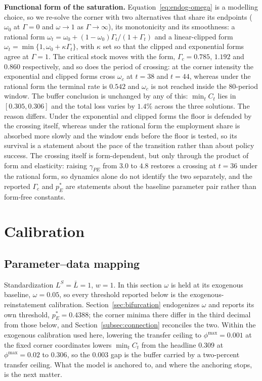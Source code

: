 \documentclass[review,12pt]{elsarticle}
\theoremstyle{plain}
\theoremstyle{definition}
\theoremstyle{remark}
\newcommand{\barL}{\bar{L}}
\begin{document}
\smallskip\noindent\textbf{Functional form of the saturation.}
Equation~\eqref{eq:endog-omega} is a modelling choice, so we re-solve the corner with two alternatives that share its endpoints ($\omega_0$ at $\Gamma=0$ and $\omega\to1$ as $\Gamma\to\infty$), its monotonicity and its smoothness: a rational form $\omega_t=\omega_0+(1-\omega_0)\Gamma_t/(1+\Gamma_t)$ and a linear-clipped form $\omega_t=\min\{1,\omega_0+\kappa\Gamma_t\}$, with $\kappa$ set so that the clipped and exponential forms agree at $\Gamma=1$. The critical stock moves with the form, $\Gamma_c=0.785$, $1.192$ and $0.860$ respectively, and so does the period of crossing: at the corner intensity the exponential and clipped forms cross $\omega_c$ at $t=38$ and $t=44$, whereas under the rational form the terminal rate is $0.542$ and $\omega_c$ is not reached inside the 80-period window. The buffer conclusion is unchanged by any of this: $\min_tC_t$ lies in $[0.305,0.306]$ and the total loss varies by $1.4\%$ across the three solutions. The reason differs. Under the exponential and clipped forms the floor is defended by the crossing itself, whereas under the rational form the employment share is absorbed more slowly and the window ends before the floor is tested, so its survival is a statement about the pace of the transition rather than about policy success. The crossing itself is form-dependent, but only through the product of form and elasticity: raising $\gamma_{PE}$ from $3.0$ to $4.8$ restores a crossing at $t=36$ under the rational form, so dynamics alone do not identify the two separately, and the reported $\Gamma_c$ and $p_E^*$ are statements about the baseline parameter pair rather than form-free constants.

\section{Calibration}
\label{sec:calibration}
\subsection{Parameter--data mapping}
Standardization $L^S=\barL=1$, $w=1$. In this section $\omega$ is held at its exogenous baseline, $\omega=0.05$, so every threshold reported below is the exogenous-reinstatement calibration. Section~\ref{sec:bifurcation} endogenizes $\omega$ and reports its own threshold, $p_E^{*}=0.4388$; the corner minima there differ in the third decimal from those below, and Section~\ref{subsec:connection} reconciles the two. Within the exogenous calibration used here, lowering the transfer ceiling to $\phi^{\max}=0.001$ at the fixed corner coordinates lowers $\min_tC_t$ from the headline $0.309$ at $\phi^{\max}=0.02$ to $0.306$, so the $0.003$ gap is the buffer carried by a two-percent transfer ceiling. What the model is anchored to, and where the anchoring stops, is the next matter.
\end{document}
